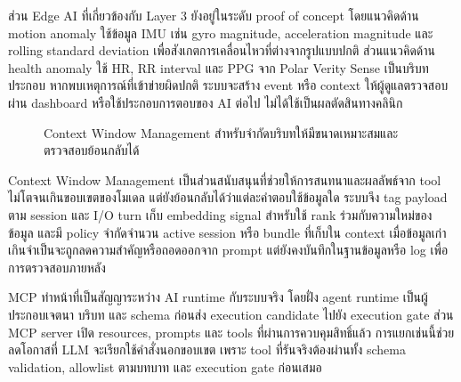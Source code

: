 ส่วน Edge AI ที่เกี่ยวข้องกับ Layer 3 ยังอยู่ในระดับ proof of concept โดยแนวคิดด้าน motion anomaly ใช้ข้อมูล IMU เช่น gyro magnitude, acceleration magnitude และ rolling standard deviation เพื่อสังเกตการเคลื่อนไหวที่ต่างจากรูปแบบปกติ ส่วนแนวคิดด้าน health anomaly ใช้ HR, RR interval และ PPG จาก Polar Verity Sense เป็นบริบทประกอบ หากพบเหตุการณ์ที่เข้าข่ายผิดปกติ ระบบจะสร้าง event หรือ context ให้ผู้ดูแลตรวจสอบผ่าน dashboard หรือใช้ประกอบการตอบของ AI ต่อไป ไม่ได้ใช้เป็นผลตัดสินทางคลินิก

\begin{figure}[!htbp]
    \centering
    \caption{Context Window Management สำหรับจำกัดบริบทให้มีขนาดเหมาะสมและตรวจสอบย้อนกลับได้}
    \label{fig:ch3_ai_context_window}
\end{figure}
\FloatBarrier

Context Window Management เป็นส่วนสนับสนุนที่ช่วยให้การสนทนาและผลลัพธ์จาก tool ไม่โตจนเกินขอบเขตของโมเดล แต่ยังย้อนกลับได้ว่าแต่ละคำตอบใช้ข้อมูลใด ระบบจึง tag payload ตาม session และ I/O turn เก็บ embedding signal สำหรับใช้ rank ร่วมกับความใหม่ของข้อมูล และมี policy จำกัดจำนวน active session หรือ bundle ที่เก็บใน context เมื่อข้อมูลเก่าเกินจำเป็นจะถูกลดความสำคัญหรือถอดออกจาก prompt แต่ยังคงบันทึกในฐานข้อมูลหรือ log เพื่อการตรวจสอบภายหลัง

MCP ทำหน้าที่เป็นสัญญาระหว่าง AI runtime กับระบบจริง โดยฝั่ง agent runtime เป็นผู้ประกอบเจตนา บริบท และ schema ก่อนส่ง execution candidate ไปยัง execution gate ส่วน MCP server เปิด resources, prompts และ tools ที่ผ่านการควบคุมสิทธิ์แล้ว การแยกเช่นนี้ช่วยลดโอกาสที่ LLM จะเรียกใช้คำสั่งนอกขอบเขต เพราะ tool ที่รันจริงต้องผ่านทั้ง schema validation, allowlist ตามบทบาท และ execution gate ก่อนเสมอ

